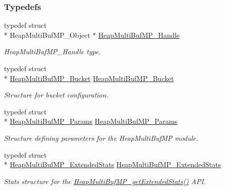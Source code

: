 \subsubsection*{Typedefs}
\begin{DoxyCompactItemize}
\item 
typedef struct \\*
Heap\-Multi\-Buf\-M\-P\-\_\-\-Object $\ast$ \hyperlink{_heap_multi_buf_m_p_8h_a84a0dbef1eb25a19072649a3c30ed4e6}{Heap\-Multi\-Buf\-M\-P\-\_\-\-Handle}
\begin{DoxyCompactList}\small\item\em Heap\-Multi\-Buf\-M\-P\-\_\-\-Handle type. \end{DoxyCompactList}\item 
typedef struct \\*
\hyperlink{struct_heap_multi_buf_m_p___bucket}{Heap\-Multi\-Buf\-M\-P\-\_\-\-Bucket} \hyperlink{_heap_multi_buf_m_p_8h_ae5ebd64bf1712fe348d9fa6ba7d93017}{Heap\-Multi\-Buf\-M\-P\-\_\-\-Bucket}
\begin{DoxyCompactList}\small\item\em Structure for bucket configuration. \end{DoxyCompactList}\item 
typedef struct \\*
\hyperlink{struct_heap_multi_buf_m_p___params}{Heap\-Multi\-Buf\-M\-P\-\_\-\-Params} \hyperlink{_heap_multi_buf_m_p_8h_a99f17c33d2dc597764d5e3cab6f96762}{Heap\-Multi\-Buf\-M\-P\-\_\-\-Params}
\begin{DoxyCompactList}\small\item\em Structure defining parameters for the Heap\-Multi\-Buf\-M\-P module. \end{DoxyCompactList}\item 
typedef struct \\*
\hyperlink{struct_heap_multi_buf_m_p___extended_stats}{Heap\-Multi\-Buf\-M\-P\-\_\-\-Extended\-Stats} \hyperlink{_heap_multi_buf_m_p_8h_a1182cc241dd94d235a2b6d1b74afc2e1}{Heap\-Multi\-Buf\-M\-P\-\_\-\-Extended\-Stats}
\begin{DoxyCompactList}\small\item\em Stats structure for the \hyperlink{_heap_multi_buf_m_p_8h_a386420101752537b59e12520aafd9b0d}{Heap\-Multi\-Buf\-M\-P\-\_\-get\-Extended\-Stats()} A\-P\-I. \end{DoxyCompactList}\end{DoxyCompactItemize}
